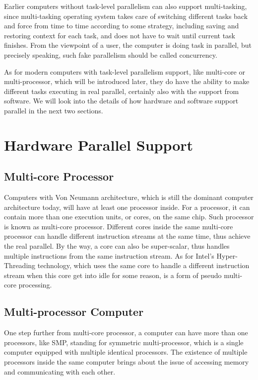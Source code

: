 \documentclass[12pt,a4paper]{report}
\begin{document}
Earlier computers without task-level parallelism can also support multi-tasking, since multi-tasking operating system takes care of switching different tasks back and force from time to time according to some strategy, including saving and restoring context for each task, and does not have to wait until current task finishes. From the viewpoint of a user, the computer is doing task in parallel, but precisely speaking, such fake parallelism should be called concurrency. 

As for modern computers with task-level parallelism support, like multi-core or multi-processor, which will be introduced later, they do have the ability to make different tasks executing in real parallel, certainly also with the support from software. We will look into the details of how hardware and software support parallel in the next two sections.

\section{Hardware Parallel Support}

\subsection{Multi-core Processor}

Computers with Von Neumann architecture, which is still the dominant computer architecture today, will have at least one processor inside. For a processor, it can contain more than one execution units, or cores, on the same chip. Such processor is known as multi-core processor. Different cores inside the same multi-core processor can handle different instruction streams at the same time, thus achieve the real parallel. By the way, a core can also be super-scalar, thus handles multiple instructions from the same instruction stream. As for Intel's Hyper-Threading technology, which uses the same core to handle a different instruction stream when this core get into idle for some reason, is a form of pseudo multi-core processing.

\subsection{Multi-processor Computer}

One step further from multi-core processor, a computer can have more than one processors, like SMP, standing for symmetric multi-processor, which is a single computer equipped with multiple identical processors. The existence of multiple processors inside the same computer brings about the issue of accessing memory and communicating with each other.
\end{document}
